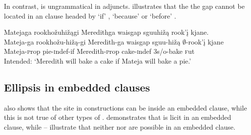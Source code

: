 \documentclass[output=paper]{LSP/langsci}
\begin{document}
In contrast,  is ungrammatical in adjuncts.  illustrates that the the gap cannot be located in an  clause headed by `if' , `because'  or `before' .

 
\ea\label{ex:johnson:36}
\ea\label{ex:johnson:36a} 
\glll Matejaga rookhožuhižągi Meredithga {waisgap sguuhižą} rook'į kjane.\\
Mateja-ga rookhožu-hižą-gi Meredith-ga {waisgap sguu-hižą} $\emptyset$-rook'į kjane\\
Mateja-{\textsc prop} pie-{\textsc indef}-if Meredith-{\textsc prop} cake-{\textsc indef} {\textsc 3s/o}-bake {\textsc fut}\\
\trans Intended: `Meredith will bake a cake if Mateja will bake a pie.'	
\label{ex:johnson:36b}
\label{ex:johnson:36c}
\z
\z

\subsection{Ellipsis in embedded clauses}\label{sec:johnson:3.4}

\citet{Goldberg2005} also shows that the  site in  constructions can be inside an embedded clause, while this is not true of other types of .  demonstrates that  is licit in an embedded clause, while -- illustrate that neither  nor  are possible in an embedded clause.
\end{document}
